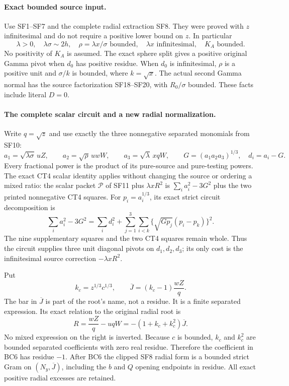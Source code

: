 \paragraph{Exact bounded source input.}
Use SF1--SF7 and the complete radial extraction SF8. They were proved
with $z$ infinitesimal and do not require a positive lower bound on $z$.
In particular
\[
 \lambda>0,\quad \lambda\sigma\sim2h,\quad
 \rho=\lambda x/\sigma\text{ bounded},\quad
 \lambda x\text{ infinitesimal},\quad K_A\text{ bounded}.
 \tag{BC2}
\]
No positivity of $K_A$ is assumed. The exact sphere split gives
a positive original Gamma pivot when $d_0$ has positive residue.
When $d_0$ is infinitesimal, $\rho$ is a positive unit and
$\sigma/k$ is bounded, where $k=\sqrt x$. The actual second
Gamma normal has the source factorization SF18--SF20, with
$R_0/\sigma$ bounded. These facts include literal $D=0$.

\paragraph{The complete scalar circuit and a new radial normalization.}
Write $q=\sqrt z$ and use exactly the three nonnegative separated
monomials from SF10:
\[
 a_1=\sqrt{\lambda\sigma}\,uZ,\qquad
 a_2=\sqrt\rho\,uwW,\qquad
 a_3=\sqrt\lambda\,xqW,
 \qquad G=(a_1a_2a_3)^{1/3},\quad d_i=a_i-G.
 \tag{BC3}
\]
Every fractional power is the product of its pure-source and
pure-testing powers. The exact CT4 scalar identity applies without
changing the source or ordering a mixed ratio: the scalar packet
$\mathscr P$ of SF11 plus $\lambda xR^2$ is
$\sum_i a_i^2-3G^2$ plus the two printed nonnegative CT4 squares.
For $p_i=a_i^{1/3}$, its exact strict circuit decomposition is
\[
 \sum_i a_i^2-3G^2
 =\sum_i d_i^2+
   \sum_{j=1}^3\sum_{i<k}
       \{\sqrt{Gp_j}(p_i-p_k)\}^2.
 \tag{BC4}
\]
The nine supplementary squares and the two CT4 squares remain whole.
Thus the circuit supplies three unit diagonal pivots on $d_1,d_2,d_3$;
its only cost is the infinitesimal source correction $-\lambda xR^2$.

Put
\[
 k_c=z^{1/3}c^{1/3},\qquad
 \overline J=(k_c-1)\frac{wZ}{q}.
 \tag{BC5}
\]
The bar in $\overline J$ is part of the root's name, not a residue.
It is a finite separated expression. Its exact relation to the
original radial root is
\[
 R=\frac{wZ}{q}-uqW
       =-(1+k_c+k_c^2)\overline J.
 \tag{BC6}
\]
No mixed expression on the right is inverted. Because $c$ is bounded,
$k_c$ and $k_c^2$ are bounded separated coefficients with zero real
residue. Therefore the coefficient in BC6 has residue $-1$.
After BC6 the clipped SF8 radial form is a bounded strict Gram on
$(N_y,\overline J)$, including the $b$ and $Q$ opening endpoints
in residue. All exact positive radial excesses are retained.

